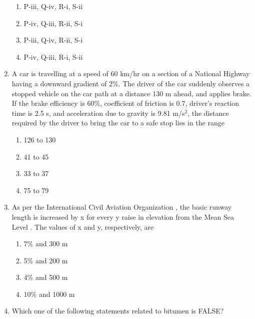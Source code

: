 \documentclass[journal,12pt,onecolumn]{article}
\theoremstyle{remark}
\begin{document}
\begin{enumerate}
    \hfill{}
    \begin{enumerate}
        \item P-iii, Q-iv, R-i, S-ii
        \item P-iv, Q-iii, R-ii, S-i
        \item P-iii, Q-iv, R-ii, S-i
        \item P-iv, Q-iii, R-i, S-ii
    \end{enumerate}

    \item A car is travelling at a speed of 60 km/hr on a section of a National Highway having a downward gradient of 2\%. The driver of the car suddenly observes a stopped vehicle on the car path at a distance 130 m ahead, and applies brake. If the brake efficiency is 60\%, coefficient of friction is 0.7, driver's reaction time is 2.5 s, and acceleration due to gravity is 9.81 m/s$^2$, the distance  required by the driver to bring the car to a safe stop lies in the range
    
    \hfill{}
    \begin{enumerate}
        \item 126 to 130
        \item 41 to 45
        \item 33 to 37
        \item 75 to 79
    \end{enumerate}

    \item As per the International Civil Aviation Organization , the basic runway length is increased by x \brak{\%} for every y  raise in elevation from the Mean Sea Level . The values of x and y, respectively, are
    
    \hfill{}
    \begin{enumerate}
        \item 7\% and 300 m
        \item 5\% and 200 m
        \item 4\% and 500 m
        \item 10\% and 1000 m
    \end{enumerate}

    \item Which one of the following statements related to bitumen is FALSE?
    

\end{enumerate}
\end{document}
